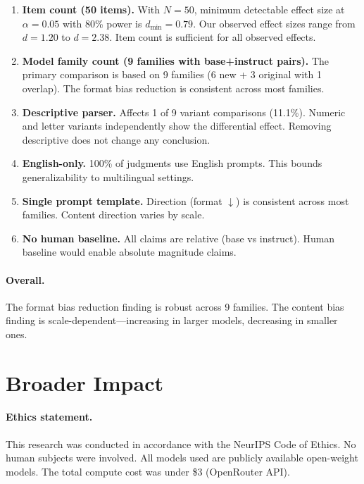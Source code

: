 \documentclass[11pt,preprint,nonatbib]{article}
\begin{document}
\begin{enumerate}
    \item \textbf{Item count (50 items).} With $N=50$, minimum detectable effect size at $\alpha=0.05$ with 80\% power is $d_{\min}=0.79$. Our observed effect sizes range from $d=1.20$ to $d=2.38$. Item count is sufficient for all observed effects.
    
    \item \textbf{Model family count (9 families with base+instruct pairs).} The primary comparison is based on 9 families (6 new + 3 original with 1 overlap). The format bias reduction is consistent across most families.
    
    \item \textbf{Descriptive parser.} Affects 1 of 9 variant comparisons (11.1\%). Numeric and letter variants independently show the differential effect. Removing descriptive does not change any conclusion.
    
    \item \textbf{English-only.} 100\% of judgments use English prompts. This bounds generalizability to multilingual settings.
    
    \item \textbf{Single prompt template.} Direction (format $\downarrow$) is consistent across most families. Content direction varies by scale.
    
    \item \textbf{No human baseline.} All claims are relative (base vs instruct). Human baseline would enable absolute magnitude claims.
\end{enumerate}

\paragraph{Overall.} The format bias reduction finding is robust across 9 families. The content bias finding is scale-dependent---increasing in larger models, decreasing in smaller ones.

\section{Broader Impact}

\paragraph{Ethics statement.}
This research was conducted in accordance with the NeurIPS Code of Ethics. No human subjects were involved. All models used are publicly available open-weight models. The total compute cost was under \$3 (OpenRouter API).
\end{document}
